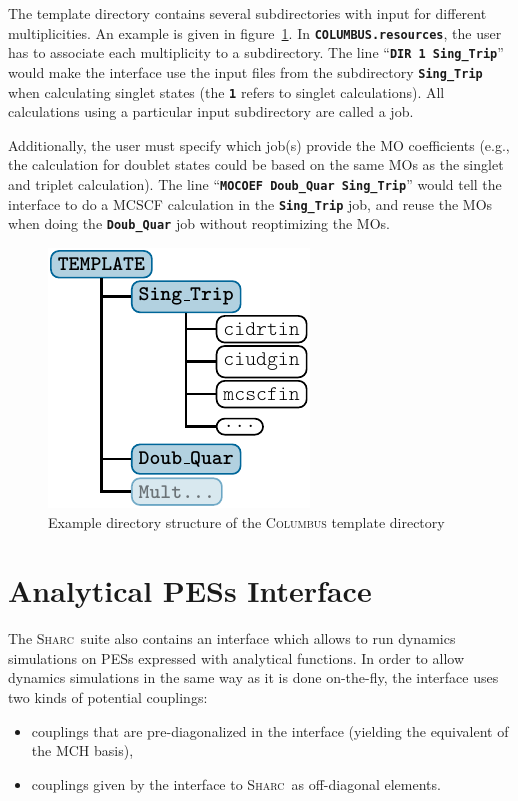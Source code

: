 \documentclass[a4paper,10pt,DIV=15,openany]{scrbook}
\newcommand{\sharc}{\textsc{Sharc}}
\newcommand{\ttt}[1]{\textbf{\texttt{#1}}}
\begin{document}
The template directory contains several subdirectories with input for different multiplicities. An example is given in figure~\ref{fig:dirs_COLtemp}. In \ttt{COLUMBUS.resources}, the user has to associate each multiplicity to a subdirectory. The line ``\ttt{DIR 1 Sing\_Trip}'' would make the interface use the input files from the subdirectory \ttt{Sing\_Trip} when calculating singlet states (the \ttt{1} refers to singlet calculations). All calculations using a particular input subdirectory are called a job.

Additionally, the user must specify which job(s) provide the MO coefficients (e.g., the calculation for doublet states could be based on the same MOs as the singlet and triplet calculation). The line ``\ttt{MOCOEF Doub\_Quar Sing\_Trip}'' would tell the interface to do a MCSCF calculation in the \ttt{Sing\_Trip} job, and reuse the MOs when doing the \ttt{Doub\_Quar} job without reoptimizing the MOs.

\begin{figure}[htb]
  \centering
  \includegraphics[scale=1]{img/dirs_COLtemp/dirs_COLtemp.pdf}
  \caption{Example directory structure of the \textsc{Columbus} template directory}
  \label{fig:dirs_COLtemp}
\end{figure}







\section{Analytical PESs Interface}\label{sec:int:analytical}

The \sharc\ suite also contains an interface which allows to run dynamics simulations on PESs expressed with analytical functions.
In order to allow dynamics simulations in the same way as it is done on-the-fly, the interface uses two kinds of potential couplings:
\begin{itemize}
  \item couplings that are pre-diagonalized in the interface (yielding the equivalent of the MCH basis),
  \item couplings given by the interface to \sharc\ as off-diagonal elements.
\end{itemize}
\end{document}
